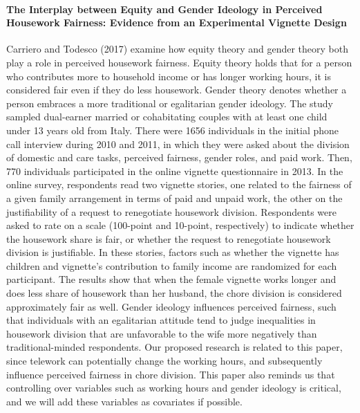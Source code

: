 \documentclass[
  english,
  man]{apa6}
\let\oldparagraph\paragraph
\renewcommand{\paragraph}[1]{\oldparagraph{#1}\mbox{}}
\begin{document}
\hypertarget{the-interplay-between-equity-and-gender-ideology-in-perceived-housework-fairness-evidence-from-an-experimental-vignette-design}{%
\paragraph{The Interplay between Equity and Gender Ideology in Perceived Housework Fairness: Evidence from an Experimental Vignette Design}\label{the-interplay-between-equity-and-gender-ideology-in-perceived-housework-fairness-evidence-from-an-experimental-vignette-design}}

Carriero and Todesco (2017) examine how equity theory and gender theory both play a role in perceived housework fairness. Equity theory holds that for a person who contributes more to household income or has longer working hours, it is considered fair even if they do less housework. Gender theory denotes whether a person embraces a more traditional or egalitarian gender ideology. The study sampled dual-earner married or cohabitating couples with at least one child under 13 years old from Italy. There were 1656 individuals in the initial phone call interview during 2010 and 2011, in which they were asked about the division of domestic and care tasks, perceived fairness, gender roles, and paid work. Then, 770 individuals participated in the online vignette questionnaire in 2013. In the online survey, respondents read two vignette stories, one related to the fairness of a given family arrangement in terms of paid and unpaid work, the other on the justifiability of a request to renegotiate housework division. Respondents were asked to rate on a scale (100-point and 10-point, respectively) to indicate whether the housework share is fair, or whether the request to renegotiate housework division is justifiable. In these stories, factors such as whether the vignette has children and vignette's contribution to family income are randomized for each participant. The results show that when the female vignette works longer and does less share of housework than her husband, the chore division is considered approximately fair as well. Gender ideology influences perceived fairness, such that individuals with an egalitarian attitude tend to judge inequalities in housework division that are unfavorable to the wife more negatively than traditional-minded respondents. Our proposed research is related to this paper, since telework can potentially change the working hours, and subsequently influence perceived fairness in chore division. This paper also reminds us that controlling over variables such as working hours and gender ideology is critical, and we will add these variables as covariates if possible.
\end{document}
